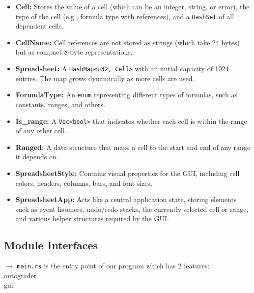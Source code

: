 \documentclass{article}
\begin{document}
\begin{itemize}
    \item \textbf{Cell:} Stores the value of a cell (which can be an integer, string, or error), the type of the cell (e.g., formula type with references), and a \texttt{HashSet} of all dependent cells.
    
    \item \textbf{CellName:} Cell references are not stored as strings (which take 24 bytes) but as compact 8-byte representations.
    
    \item \textbf{Spreadsheet:} A \texttt{HashMap<u32, Cell>} with an initial capacity of 1024 entries. The map grows dynamically as more cells are used.
    
    \item \textbf{FormulaType:} An \texttt{enum} representing different types of formulas, such as constants, ranges, and others.
    
    \item \textbf{Is\_range:} A \texttt{Vec<bool>} that indicates whether each cell is within the range of any other cell.
    
    \item \textbf{Ranged:} A data structure that maps a cell to the start and end of any range it depends on.
    
    \item \textbf{SpreadsheetStyle:} Contains visual properties for the GUI, including cell colors, headers, columns, bars, and font sizes.
    
    \item \textbf{SpreadsheetApp:} Acts like a central application state, storing elements such as event listeners, undo/redo stacks, the currently selected cell or range, and various helper structures required by the GUI.
\end{itemize}

\subsection{Module Interfaces}
\label{sec:interfaces}

$\rightarrow$ \texttt{main.rs} is the entry point of our program which has 2 features:\\
\hspace*{5mm}autograder\\
\hspace*{5mm}gui\\
\end{document}
